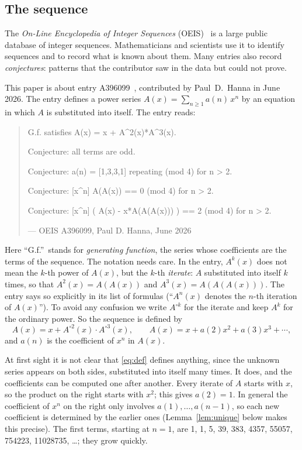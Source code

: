 \documentclass[11pt,a4paper]{article}
\theoremstyle{definition}
\theoremstyle{remark}
\begin{document}
\subsection{The sequence}\label{sec:sequence}
The \emph{On-Line Encyclopedia of Integer Sequences} (OEIS)~\cite{oeisdb} is a large public database of integer
sequences. Mathematicians and scientists use it to identify sequences and to record what is known about them. Many
entries also record \emph{conjectures}: patterns that the contributor saw in the data but could not prove.

This paper is about entry A396099~\cite{oeis}, contributed by Paul~D.~Hanna in June 2026.
The entry defines a power series $A(x)=\sum_{n\ge1}a(n)\,x^n$ by an equation in which $A$ is substituted into
itself. The entry reads:
\begin{quote}\small\ttfamily\raggedright G.f. satisfies A(x) = x + A\^{}2(x)*A\^{}3(x).\par\smallskip Conjecture: all terms are odd.\par\smallskip Conjecture: a(n) = [1,3,3,1] repeating (mod 4) for n > 2.\par\smallskip Conjecture: [x\^{}n] A(A(x)) == 0 (mod 4) for n > 2.\par\smallskip Conjecture: [x\^{}n] ( A(x) - x*A(A(A(x))) ) == 2 (mod 4) for n > 2.\par\smallskip\hfill\textrm{--- OEIS A396099, Paul D. Hanna, June 2026}\end{quote}

Here ``G.f.''\ stands for \emph{generating function}, the series whose coefficients are the terms of the sequence.
The notation needs care. In the entry, $A^k(x)$ does not mean the $k$-th power of $A(x)$, but the $k$-th
\emph{iterate}: $A$ substituted into itself $k$ times, so that $A^2(x)=A(A(x))$ and $A^3(x)=A(A(A(x)))$. The entry
says so explicitly in its list of formulas (``$A^n(x)$ denotes the $n$-th iteration of $A(x)$''). To avoid any
confusion we write $A^{\circ k}$ for the iterate and keep $A^k$ for the ordinary power. So the sequence is defined by
\begin{equation}\label{eq:def}
A(x)=x+A^{\circ2}(x)\cdot A^{\circ3}(x),\qquad A(x)=x+a(2)x^2+a(3)x^3+\cdots,
\end{equation}
and $a(n)$ is the coefficient of $x^n$ in $A(x)$.

At first sight it is not clear that \eqref{eq:def} defines anything, since the unknown series appears on both sides,
substituted into itself many times. It does, and the coefficients can be computed one after another. Every iterate
of $A$ starts with $x$, so the product on the right starts with $x^2$; this gives $a(2)=1$. In general the
coefficient of $x^n$ on the right only involves $a(1),\dots,a(n-1)$, so each new coefficient is determined by the
earlier ones (Lemma~\ref{lem:unique} below makes this precise). The first terms, starting at $n=1$, are
1, 1, 5, 39, 383, 4357, 55057, 754223, 11028735, \dots; they grow quickly.
\end{document}
